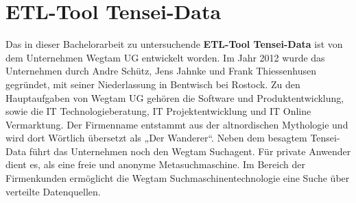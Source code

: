 
\chapter{ETL-Tool Tensei-Data}
Das in dieser Bachelorarbeit zu untersuchende \textbf{ETL-Tool Tensei-Data} ist von dem Unternehmen Wegtam UG entwickelt worden. Im Jahr 2012 wurde das Unternehmen durch Andre Schütz, Jens Jahnke und Frank Thiessenhusen gegründet, mit seiner Niederlassung in Bentwisch bei Rostock. Zu den Hauptaufgaben von Wegtam UG gehören die Software und Produktentwicklung, sowie die IT Technologieberatung, IT Projektentwicklung und IT Online Vermarktung. Der Firmenname entstammt aus der altnordischen Mythologie und wird dort Wörtlich übersetzt als „Der Wanderer“. Neben dem besagtem Tensei-Data führt das Unternehmen noch den Wegtam Suchagent. Für private Anwender dient es, als eine freie und anonyme Metasuchmaschine. Im Bereich der Firmenkunden ermöglicht die Wegtam Suchmaschinentechnologie eine Suche über verteilte Datenquellen. \cite{wegtam:prof}

